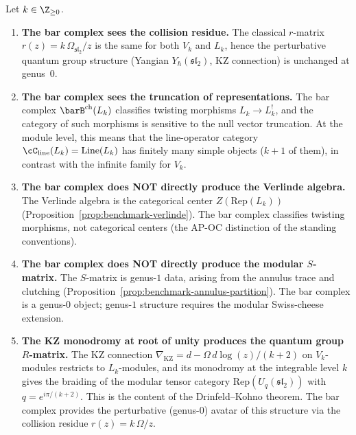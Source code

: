 \begin{proposition}
\label{prop:bar-sees-quantum-group}
Let $k \in \Z_{\ge 0}$.
\begin{enumerate}[label=\textup{(\roman*)},nosep]
\item \textbf{The bar complex sees the collision residue.}
 The classical $r$-matrix
 $r(z) = k\,\Omega_{\mathfrak{sl}_2}/z$ is the same for both
 $V_k$ and $L_k$, hence the perturbative quantum group
 structure \textup{(}Yangian $Y_\hbar(\mathfrak{sl}_2)$,
 KZ connection\textup{)} is unchanged at genus~$0$.

\item \textbf{The bar complex sees the truncation of
 representations.}
 The bar complex $\barB^{\mathrm{ch}}(L_k)$ classifies
 twisting morphisms $L_k \to L_k^!$, and the category
 of such morphisms is sensitive to the null vector
 truncation. At the module level, this means that the
 line-operator category
 $\cC_{\mathrm{line}}(L_k) = \operatorname{Line}(L_k)$
 has finitely many simple objects \textup{(}$k + 1$ of them\textup{)},
 in contrast with the infinite family for $V_k$.

\item \textbf{The bar complex does NOT directly produce the
 Verlinde algebra.}
 The Verlinde algebra is the categorical center
 $Z(\mathrm{Rep}(L_k))$
 \textup{(}Proposition~\textup{\ref{prop:benchmark-verlinde}}\textup{)}.
 The bar complex classifies twisting morphisms, not
 categorical centers
 \textup{(}the AP-OC distinction of the standing
 conventions\textup{)}.

\item \textbf{The bar complex does NOT directly produce
 the modular $S$-matrix.}
 The $S$-matrix is genus-$1$ data, arising from the
 annulus trace and clutching
 \textup{(}Proposition~\textup{\ref{prop:benchmark-annulus-partition}}\textup{)}.
 The bar complex is a genus-$0$ object; genus-$1$
 structure requires the modular Swiss-cheese extension.

\item \textbf{The KZ monodromy at root of unity produces
 the quantum group $R$-matrix.}
 The KZ connection $\nabla_{\mathrm{KZ}} = d - \Omega\,
 d\log(z)/(k+2)$ on $V_k$-modules restricts to $L_k$-modules,
 and its monodromy at the integrable level $k$ gives the
 braiding of the modular tensor category
 $\mathrm{Rep}(U_q(\mathfrak{sl}_2))$ with
 $q = e^{i\pi/(k+2)}$. This is the content of the
 Drinfeld--Kohno theorem. The bar complex provides
 the perturbative (genus-$0$) avatar of this structure
 via the collision residue $r(z) = k\,\Omega/z$.
\end{enumerate}
\end{proposition}


